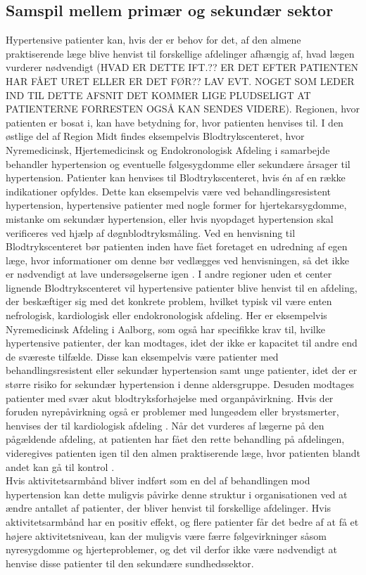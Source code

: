 \subsection{Samspil mellem primær og sekundær sektor}
Hypertensive patienter kan, hvis der er behov for det, af den almene praktiserende læge blive henvist til forskellige afdelinger afhængig af, hvad lægen vurderer nødvendigt (HVAD ER DETTE IFT.?? ER DET EFTER PATIENTEN HAR FÅET URET ELLER ER DET FØR?? LAV EVT. NOGET SOM LEDER IND TIL DETTE AFSNIT DET KOMMER LIGE PLUDSELIGT AT PATIENTERNE FORRESTEN OGSÅ KAN SENDES VIDERE). Regionen, hvor patienten er bosat i, kan have betydning for, hvor patienten henvises til. I den østlige del af Region Midt findes eksempelvis Blodtrykscenteret, hvor Nyremedicinsk, Hjertemedicinsk og Endokronologisk Afdeling i samarbejde behandler hypertension og eventuelle følgesygdomme eller sekundære årsager til hypertension. Patienter kan henvises til Blodtrykscenteret, hvis én af en række indikationer opfyldes. Dette kan eksempelvis være ved behandlingsresistent hypertension, hypertensive patienter med nogle former for hjertekarsygdomme, mistanke om sekundær hypertension, eller hvis nyopdaget hypertension skal verificeres ved hjælp af døgnblodtryksmåling. Ved en henvisning til Blodtrykscenteret bør patienten inden have fået foretaget en udredning af egen læge, hvor informationer om denne bør vedlægges ved henvisningen, så det ikke er nødvendigt at lave undersøgelserne igen \citep{aarhusuniversitetshopsital}. I andre regioner uden et center lignende Blodtrykscenteret vil hypertensive patienter blive henvist til en afdeling, der beskæftiger sig med det konkrete problem, hvilket typisk vil være enten nefrologisk, kardiologisk eller endokronologisk afdeling. Her er eksempelvis Nyremedicinsk Afdeling i Aalborg, som også har specifikke krav til, hvilke hypertensive patienter, der kan modtages, idet der ikke er kapacitet til andre end de sværeste tilfælde. Disse kan eksempelvis være patienter med behandlingsresistent eller sekundær hypertension samt unge patienter, idet der er større risiko for sekundær hypertension i denne aldersgruppe. Desuden modtages patienter med svær akut blodtryksforhøjelse med organpåvirkning. Hvis der foruden nyrepåvirkning også er problemer med lungeødem eller brystsmerter, henvises der til kardiologisk afdeling \citep{buur2011}. Når det vurderes af lægerne på den pågældende afdeling, at patienten har fået den rette behandling på afdelingen, videregives patienten igen til den almen praktiserende læge, hvor patienten blandt andet kan gå til kontrol \citep{sundhedsstyrelsen2010, lodberg2016}. \\
Hvis aktivitetsarmbånd bliver indført som en del af behandlingen mod hypertension kan dette muligvis påvirke denne struktur i organisationen ved at ændre antallet af patienter, der bliver henvist til forskellige afdelinger. Hvis aktivitetsarmbånd har en positiv effekt, og flere patienter får det bedre af at få et højere aktivitetsniveau, kan der muligvis være færre følgevirkninger såsom nyresygdomme og hjerteproblemer, og det vil derfor ikke være nødvendigt at henvise disse patienter til den sekundære sundhedssektor. 

